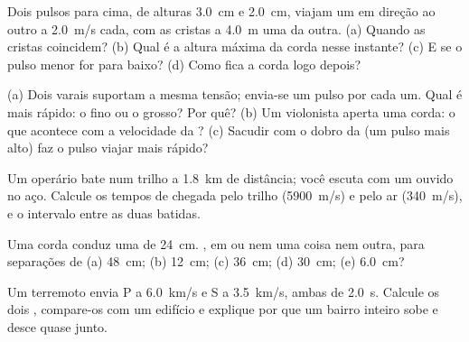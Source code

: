 \begin{exercise}[$\star\star$]\label{exo:g12:mechanical-waves:7}
Dois pulsos para cima, de alturas \qty{3.0}{cm} e \qty{2.0}{cm}, viajam
um em direção ao outro a \qty{2.0}{m/s} cada, com as cristas a
\qty{4.0}{m} uma da outra. (a) Quando as cristas coincidem? (b) Qual é a
altura máxima da corda nesse instante? (c) E se o pulso menor for para
baixo? (d) Como fica a corda logo depois?
\end{exercise}

\begin{exercise}[$\star\star$]\label{exo:g12:mechanical-waves:8}
(a) Dois varais suportam a mesma tensão; envia-se um pulso por cada um.
Qual é mais rápido: o fino ou o grosso? Por quê? (b) Um violonista
aperta uma corda: o que acontece com a velocidade da ? (c) Sacudir
com o dobro da  (um pulso mais alto) faz o pulso viajar mais
rápido?
\end{exercise}

\begin{exercise}[$\star\star$]\label{exo:g12:mechanical-waves:9}
Um operário bate num trilho a \qty{1.8}{km} de distância; você escuta com
um ouvido no aço. Calcule os tempos de chegada pelo trilho
(\qty{5900}{m/s}) e pelo ar (\qty{340}{m/s}), e o intervalo entre as duas
batidas.
\end{exercise}

\begin{exercise}[$\star\star$]\label{exo:g12:mechanical-waves:10}
Uma corda conduz uma  de  \qty{24}{cm}.
, em  ou nem uma coisa nem outra, para separações
de (a) \qty{48}{cm}; (b) \qty{12}{cm}; (c) \qty{36}{cm}; (d)
\qty{30}{cm}; (e) \qty{6.0}{cm}?
\end{exercise}

\begin{exercise}[$\star\star$]\label{exo:g12:mechanical-waves:11}
Um terremoto envia  P a \qty{6.0}{km/s} e  S a \qty{3.5}{km/s},
ambas de  \qty{2.0}{s}. Calcule os dois ,
compare-os com um edifício e explique por que um bairro inteiro sobe e
desce quase junto.
\end{exercise}

